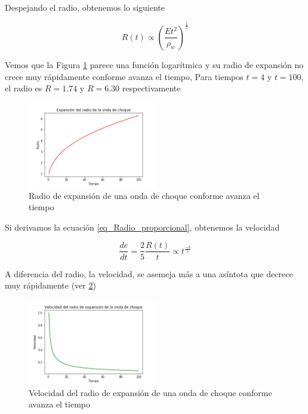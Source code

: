\documentclass[12pt,a4paper]{book}
\begin{document}
Despejando el radio, obtenemos lo siguiente

\begin{equation} \label{eq_Radio_proporcional}
  R(t) \varpropto \left(\frac{E t^2}{\rho_w}\right)^{\frac{1}{5}}
\end{equation}

Vemos que la Figura \ref{fig_Radio_v_tiempo} parece una función logarítmica y su radio de expansión no crece muy rápidamente conforme avanza el tiempo,
Para tiempos $t = 4$ y $t = 100$, el radio es $R = 1.74$ y $R = 6.30$ respectivamente

\begin{figure}
  \centering
    \includegraphics[width=0.5\textwidth]{Figuras/Teoria/Radio_vs_tiempo.png}
  \caption{Radio de expansión de una onda de choque conforme avanza el tiempo } \label{fig_Radio_v_tiempo}
\end{figure}

Si derivamos la ecuación \ref{eq_Radio_proporcional}, obtenemos la velocidad

\begin{equation}
  \dfrac{de}{dt} = \frac{2}{5}\frac{R(t)}{t} \varpropto t^{\frac{-3}{5}}
\end{equation}

A diferencia del radio, la velocidad, se asemeja más a una asíntota que decrece muy rápidamente (ver \ref{fig_velocidad_vs_radio})

\begin{figure}
  \centering
    \includegraphics[width=0.5\textwidth]{Figuras/Teoria/Velocidad_vs_tiempo.png}
  \caption{Velocidad del radio de expansión de una onda de choque conforme avanza el tiempo } \label{fig_velocidad_vs_radio}
\end{figure}
\end{document}
